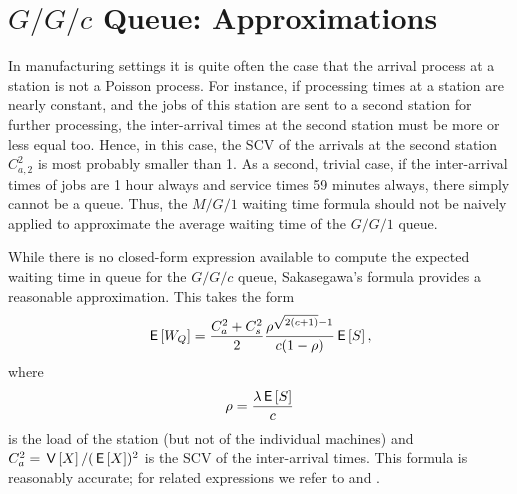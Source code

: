 \section{$G/G/c$ Queue: Approximations}
\label{sec:gg1}






In manufacturing settings it is quite often the case that the arrival process at a station is not a Poisson process.
For instance, if processing times at a station are nearly constant, and the jobs of this station are sent to a second station for further processing, the inter-arrival times at the second station must be more or less equal too.
Hence, in this case, the SCV of the arrivals at the second station $C_{a,2}^2$ is most probably smaller than 1.
As a second, trivial case, if the inter-arrival times of jobs are 1 hour always and service times 59 minutes always, there simply cannot be a queue.
Thus, the $M/G/1$ waiting time formula should not be naively applied to approximate the average waiting time of the $G/G/1$ queue.

While there is no closed-form expression available to compute the expected waiting time in queue for the $G/G/c$ queue, Sakasegawa's formula provides a reasonable approximation. This takes the form
\begin{equation}\label{eq:7}
 \,\mathsf{E}\left[W_Q\right] = \frac{C_a^2+C_s^2}2 \frac{\rho^{\sqrt{2(c+1)}-1}}{c(1-\rho)} \,\mathsf{E}\left[S\right],
\end{equation}
where
\begin{equation*}
 \rho = \frac{\lambda \,\mathsf{E}\left[S\right]}{c}
\end{equation*}
is the load of the station (but not of the individual machines) and $C_a^2 = \,\mathsf{V}\left[X\right]/(\,\mathsf{E}\left[X\right])^2$ is the SCV of the inter-arrival times.
This formula is reasonably accurate; for related expressions we refer to \citet{bolch06:_queuein_networ_markov_chain} and \citet{hall91:_queuein_method_servic_manuf}.


